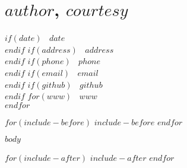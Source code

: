 \documentclass[$if(fontsize)$$fontsize$,$endif$$if(lang)$$lang$,$endif$$if(papersize)$$papersize$,$endif$$for(classoption)$$classoption$$sep$,$endfor$]{$documentclass$}
\begin{document}
\thispagestyle{empty}

\section{$author$, $courtesy$}\label{author}

$if(date)$
\textcolor{sectiongray}{\faCalendar} \(~\) $date$\\
$endif$
$if(address)$
\textcolor{sectiongray}{\faMap} \(~\) $address$\\
$endif$
$if(phone)$
\textcolor{sectiongray}{\faPhone} \(~\) $phone$\\
$endif$
$if(email)$
\textcolor{sectiongray}{\faEnvelope} \(~\) $email$\\
$endif$
$if(github)$
\textcolor{sectiongray}{\faGithub} \(~\) $github$\\
$endif$
$for(www)$
\textcolor{sectiongray}{\faGlobe} \(~\) $www$\\
$endfor$

$for(include-before)$
$include-before$
$endfor$

$body$

$for(include-after)$
$include-after$
$endfor$
\end{document}
